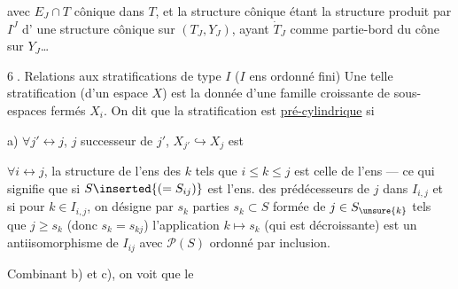 avec $E_J\cap T$ cônique dans $T$, et la structure cônique
 étant la structure produit par $I^J$ d'
une structure cônique sur $(T_J,Y_J)$, ayant
$\dot T_J$ comme partie-bord du cône sur $Y_J$\ldots


\textcircled{6.} Relations aux stratifications de type $I$
($I$ ens ordonné fini)
Une telle stratification (d'un espace $X$) est
la donnée d'une famille croissante de
sous-espaces fermés $X_i$. On dit que
la stratification est \uline{pré-cylindrique} si

a) $\forall j'\leftrightarrow j$, $j$ successeur de $j'$,
$X_{j'}\hookrightarrow X_j$ est
 



$\forall i\leftrightarrow j$, la structure de l'ens 
des $k$ tels que $i\le k\le j$ est celle de l'ens
  --- ce qui signifie que
si $S\inserted{(=S_{ij})}$ est l'ens. des prédécesseurs de $j$ dans
$I_{i,j}$ 
et si pour \unsure{$\forall$} $k\in I_{i,j}$, on désigne
 par $s_k$  parties $s_k\subset S$ formée
de $j\in S_{\unsure{k}}$ tels que
$j\ge s_k$ (donc $s_k=s_{kj}$)
l'application $k\longmapsto s_k$ (qui est décroissante)
est un antiisomorphisme de $I_{ij}$ avec $\mathcal P(S)$
ordonné par inclusion. 




Combinant b) et c), on voit que le
